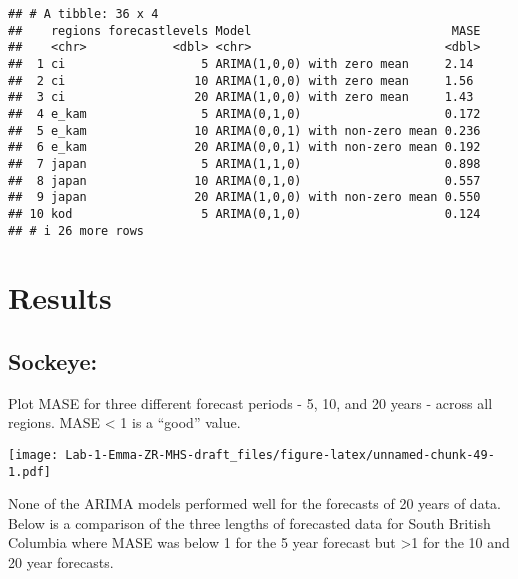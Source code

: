 \documentclass[
]{article}
\begin{document}
\begin{verbatim}
## # A tibble: 36 x 4
##    regions forecastlevels Model                            MASE
##    <chr>            <dbl> <chr>                           <dbl>
##  1 ci                   5 ARIMA(1,0,0) with zero mean     2.14 
##  2 ci                  10 ARIMA(1,0,0) with zero mean     1.56 
##  3 ci                  20 ARIMA(1,0,0) with zero mean     1.43 
##  4 e_kam                5 ARIMA(0,1,0)                    0.172
##  5 e_kam               10 ARIMA(0,0,1) with non-zero mean 0.236
##  6 e_kam               20 ARIMA(0,0,1) with non-zero mean 0.192
##  7 japan                5 ARIMA(1,1,0)                    0.898
##  8 japan               10 ARIMA(0,1,0)                    0.557
##  9 japan               20 ARIMA(1,0,0) with non-zero mean 0.550
## 10 kod                  5 ARIMA(0,1,0)                    0.124
## # i 26 more rows
\end{verbatim}

\hypertarget{results}{%
\section{Results}\label{results}}

\hypertarget{sockeye}{%
\subsection{Sockeye:}\label{sockeye}}

Plot MASE for three different forecast periods - 5, 10, and 20 years -
across all regions. MASE \textless{} 1 is a ``good'' value.

\texttt{[image: Lab-1-Emma-ZR-MHS-draft\_files/figure-latex/unnamed-chunk-49-1.pdf]}

None of the ARIMA models performed well for the forecasts of 20 years of
data. Below is a comparison of the three lengths of forecasted data for
South British Columbia where MASE was below 1 for the 5 year forecast
but \textgreater1 for the 10 and 20 year forecasts.
\end{document}
